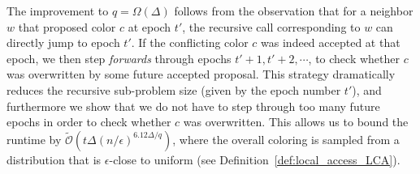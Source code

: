 The improvement to $q = \Omega(\Delta)$ follows from the observation that for a neighbor $w$ that proposed color $c$ at epoch $t'$,
the recursive call corresponding to $w$ can directly jump to epoch $t'$.
If the conflicting color $c$ was indeed accepted at that epoch,
we then step \emph{forwards} through epochs $t'+1, t'+2,\cdots$, to check whether $c$ was overwritten by some future accepted proposal.
This strategy dramatically reduces the recursive sub-problem size (given by the epoch number $t'$),
and furthermore we show that we do not have to step through too many future epochs in order to check whether $c$ was overwritten.
This allows us to bound the runtime by $\widetilde{\mathcal O}\left(t\Delta (n/\epsilon)^{6.12\Delta/q}\right)$,
where the overall coloring is sampled from a distribution that is $\epsilon$-close to uniform (see Definition~\ref{def:local_access_LCA}).
